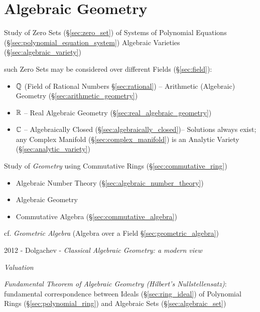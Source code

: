 \part{Algebraic Geometry}\label{part:algebraic_geometry}

Study of Zero Sets (\S\ref{sec:zero_set}) of Systems of Polynomial Equations
(\S\ref{sec:polynomial_equation_system}) \fist Algebraic Varieties
(\S\ref{sec:algebraic_variety})

such Zero Sets may be considered over different Fields (\S\ref{sec:field}):
\begin{itemize}
  \item $\mathbb{Q}$ (Field of Rational Numbers \S\ref{sec:rational}) --
    Arithmetic (Algebraic) Geometry (\S\ref{sec:arithmetic_geometry})
  \item $\mathbb{R}$ -- Real Algebraic Geometry
    (\S\ref{sec:real_algebraic_geometry})
  \item $\mathbb{C}$ -- Algebraically Closed (\S\ref{sec:algebraically_closed})--
    Solutions always exist; any Complex Manifold (\S\ref{sec:complex_manifold})
    is an Analytic Variety (\S\ref{sec:analytic_variety})
\end{itemize}

Study of \emph{Geometry} using Commutative Rings (\S\ref{sec:commutative_ring})

\begin{itemize}
  \item Algebraic Number Theory (\S\ref{sec:algebraic_number_theory})
  \item Algebraic Geometry
  \item Commutative Algebra (\S\ref{sec:commutative_algebra})
\end{itemize}

cf. \emph{Geometric Algebra} (Algebra over a Field
\S\ref{sec:geometric_algebra})

2012 - Dolgachev - \emph{Classical Algebraic Geometry: a modern view}

\emph{Valuation}

\emph{Fundamental Theorem of Algebraic Geometry (Hilbert's Nullstellensatz)}:
fundamental correspondence between Ideals (\S\ref{sec:ring_ideal}) of Polynomial
Rings (\S\ref{sec:polynomial_ring}) and Algebraic Sets
(\S\ref{sec:algebraic_set})

